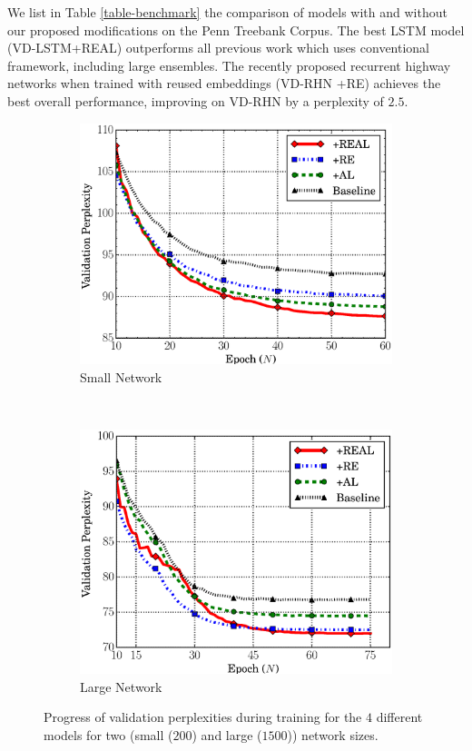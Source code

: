 We list in Table \ref{table-benchmark} the comparison of models with and without our proposed modifications on the Penn Treebank Corpus. The best LSTM model (VD-LSTM+REAL) outperforms all previous work which uses conventional framework, including large ensembles. The recently proposed recurrent highway networks \citep{zilly2016recurrent} when trained with reused embeddings (VD-RHN +RE) achieves the best overall performance, improving on VD-RHN by a perplexity of $2.5$.

\begin{figure}[t!]
    \centering
    \begin{subfigure}[t]{0.5\textwidth}
        \centering
        \includegraphics[scale=0.32]{REAL_Small_valid_new_notscaled.eps}
        \caption{Small Network}
    \end{subfigure}%
    ~ 
    \begin{subfigure}[t]{0.5\textwidth}
        \centering
        \includegraphics[scale=0.32]{REAL_Large_valid_notscaled.eps}
        \caption{Large Network}
    \end{subfigure}
    \caption{Progress of validation perplexities during training for the $4$ different models for two (small ($200$) and large ($1500$)) network sizes.}
    \label{fig:val_perp_4models}
\end{figure}



